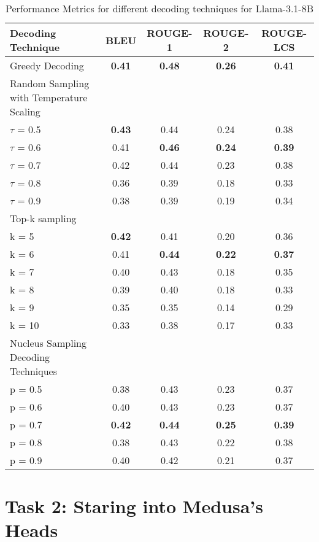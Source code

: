 \documentclass{article}
\begin{document}
\begin{table}[h!]
\begin{center}
\begin{tabular}{|l||c c c c||} 
\hline
Decoding Technique & BLEU & ROUGE-1 & ROUGE-2 & ROUGE-LCS \\ [0.5ex] 
\hline\hline
Greedy Decoding  & \textbf{0.41} & \textbf{0.48} & \textbf{0.26} &\textbf{0.41} \\ 
\hline 
Random Sampling with Temperature Scaling & & & &\\ 
$\tau$ = 0.5 & \textbf{0.43} & 0.44 & 0.24 & 0.38 \\ 
$\tau$ = 0.6 & 0.41 & \textbf{0.46} & \textbf{0.24} & \textbf{0.39} \\ 
$\tau$ = 0.7 & 0.42 & 0.44 & 0.23 & 0.38 \\ 
$\tau$ = 0.8 & 0.36 & 0.39 & 0.18 & 0.33 \\ 
$\tau$ = 0.9 & 0.38 & 0.39 & 0.19 & 0.34 \\ 
\hline 
Top-k sampling & & & &\\ 
k = 5 & \textbf{0.42} & 0.41 & 0.20 & 0.36 \\ 
k = 6 & 0.41 & \textbf{0.44} & \textbf{0.22} & \textbf{0.37} \\ 
k = 7 & 0.40 & 0.43 & 0.18 & 0.35 \\ 
k = 8 & 0.39 & 0.40 & 0.18 & 0.33 \\ 
k = 9 & 0.35 & 0.35 & 0.14 & 0.29 \\ 
k = 10 & 0.33 & 0.38 & 0.17 & 0.33 \\ 
\hline 
Nucleus Sampling Decoding Techniques & & & &\\ 
p = 0.5 & 0.38 & 0.43 & 0.23 & 0.37 \\ 
p = 0.6 & 0.40 & 0.43 & 0.23 & 0.37 \\ 
p = 0.7 & \textbf{0.42} & \textbf{0.44} & \textbf{0.25} & \textbf{0.39} \\ 
p = 0.8 & 0.38 & 0.43 & 0.22 & 0.38 \\ 
p = 0.9 & 0.40 & 0.42 & 0.21 & 0.37 \\ 
\hline 
\end{tabular}
\end{center}
\caption{Performance Metrics for different decoding techniques for Llama-3.1-8B}
\end{table}

\section{Task 2: Staring into Medusa's Heads}
\end{document}
